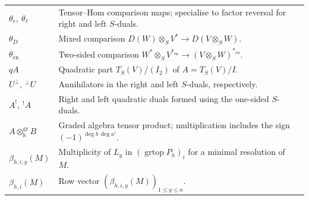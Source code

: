 \documentclass[11pt,a4paper]{article}
\numberwithin{equation}{section}
\theoremstyle{all}
\theoremstyle{remark}
\newcommand{\grtop}{\operatorname{grtop}\nolimits}
\newcommand{\en}{\mathrm{en}}
\begin{document}
\begin{longtable}{@{}p{}p{}r@{}}
$\theta_r,\ \theta_\ell$ & Tensor--Hom comparison maps; specialise to factor reversal for right and left $S$-duals. & \hyperref[eq:general-tensor-duals]{\pageref*{eq:general-tensor-duals}}\\[3pt]
$\theta_D$ & Mixed comparison $D(W)\otimes_S V^*\to D(V\otimes_S W)$. & \hyperref[not:mixed-tensor-dual]{\pageref*{not:mixed-tensor-dual}}\\[3pt]
$\theta_{\en}$ & Two-sided comparison $W^*\otimes_S V^{*_{\en}}\to(V\otimes_S W)^{*_{\en}}$. & \hyperref[eq:tensor-two-sided-dual]{\pageref*{eq:tensor-two-sided-dual}}\\[3pt]
$qA$ & Quadratic part $T_S(V)/(I_2)$ of $A=T_S(V)/I$. & \hyperref[def:quadratic-part]{\pageref*{def:quadratic-part}}\\[3pt]
$U^\perp,\ {}^\perp U$ & Annihilators in the right and left $S$-duals, respectively. & \hyperref[def:orthogonals]{\pageref*{def:orthogonals}}\\[3pt]
$A^!,\ {}^!A$ & Right and left quadratic duals formed using the one-sided $S$-duals. & \hyperref[def:S-quadratic-duals]{\pageref*{def:S-quadratic-duals}}\\[3pt]
$A\otimes_\Bbbk^{\mathrm{gr}}B$ & Graded algebra tensor product; multiplication includes the sign $(-1)^{\deg b\,\deg a'}$. & \hyperref[def:algebra-tensor-products]{\pageref*{def:algebra-tensor-products}}\\[3pt]
$\beta_{h,i,y}(M)$ & Multiplicity of $L_y$ in $(\grtop P_h)_i$ for a minimal resolution of $M$. & \hyperref[not:graded-betti]{\pageref*{not:graded-betti}}\\[3pt]
$\beta_{h,i}(M)$ & Row vector $(\beta_{h,i,y}(M))_{1\leq y\leq n}$. & \hyperref[not:graded-betti]{\pageref*{not:graded-betti}}\\[3pt]
\end{longtable}
\endgroup
\end{document}
